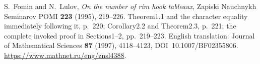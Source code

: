 S.~Fomin and N.~Lulov, \emph{On the number of rim hook tableaux},
Zapiski Nauchnykh Seminarov POMI \textbf{223} (1995), 219--226.
Theorem1.1 and the character equality immediately following it,
p.~220; Corollary2.2 and Theorem2.3, p.~221; the complete
invoked proof in Sections1--2, pp.~219--223.
English translation: Journal of Mathematical Sciences \textbf{87}
(1997), 4118--4123, DOI\ 10.1007/BF02355806.
\url{https://www.mathnet.ru/eng/znsl4388}.
